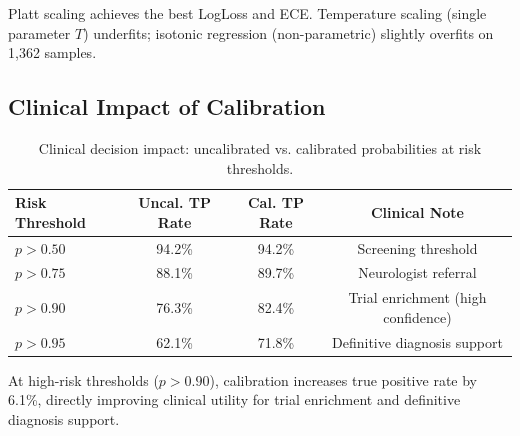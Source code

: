 Platt scaling achieves the best LogLoss and ECE. Temperature scaling (single parameter $T$) underfits; isotonic regression (non-parametric) slightly overfits on 1,362 samples.

\subsection{Clinical Impact of Calibration}
\label{sec:cal_clinical}

\begin{table}[H]
\centering
\caption{Clinical decision impact: uncalibrated vs. calibrated probabilities at risk thresholds.}
\label{tab:cal_clinical}
\begin{tabular}{lccc}
\toprule
\textbf{Risk Threshold} & \textbf{Uncal. TP Rate} & \textbf{Cal. TP Rate} & \textbf{Clinical Note} \\
\midrule
$p > 0.50$ & 94.2\% & 94.2\% & Screening threshold \\
$p > 0.75$ & 88.1\% & 89.7\% & Neurologist referral \\
$p > 0.90$ & 76.3\% & 82.4\% & Trial enrichment (high confidence) \\
$p > 0.95$ & 62.1\% & 71.8\% & Definitive diagnosis support \\
\bottomrule
\end{tabular}
\end{table}

At high-risk thresholds ($p > 0.90$), calibration increases true positive rate by 6.1\%, directly improving clinical utility for trial enrichment and definitive diagnosis support.